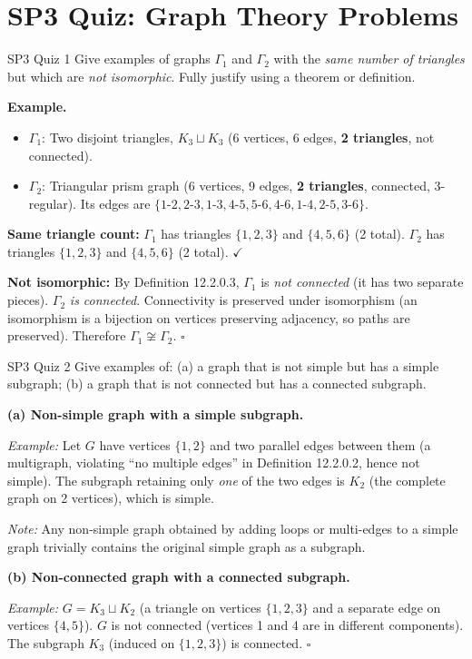 \section*{SP3 Quiz: Graph Theory Problems}

\begin{exercise}{SP3 Quiz 1}
Give examples of graphs $\Gamma_1$ and $\Gamma_2$ with the \emph{same number of triangles} but which are \emph{not isomorphic}. Fully justify using a theorem or definition.
\end{exercise}
\begin{solution}
\textbf{Example.}
\begin{itemize}
  \item $\Gamma_1$: Two disjoint triangles, $K_3\sqcup K_3$ (6 vertices, 6 edges, \textbf{2 triangles}, not connected).
  \item $\Gamma_2$: Triangular prism graph (6 vertices, 9 edges, \textbf{2 triangles}, connected, 3-regular). Its edges are $\{1\text{-}2,2\text{-}3,1\text{-}3,4\text{-}5,5\text{-}6,4\text{-}6,1\text{-}4,2\text{-}5,3\text{-}6\}$.
\end{itemize}

\textbf{Same triangle count:} $\Gamma_1$ has triangles $\{1,2,3\}$ and $\{4,5,6\}$ (2 total). $\Gamma_2$ has triangles $\{1,2,3\}$ and $\{4,5,6\}$ (2 total). $\checkmark$

\textbf{Not isomorphic:} By Definition 12.2.0.3, $\Gamma_1$ is \emph{not connected} (it has two separate pieces). $\Gamma_2$ \emph{is connected}. Connectivity is preserved under isomorphism (an isomorphism is a bijection on vertices preserving adjacency, so paths are preserved). Therefore $\Gamma_1\not\cong\Gamma_2$. $\square$
\end{solution}

\begin{exercise}{SP3 Quiz 2}
Give examples of: (a) a graph that is not simple but has a simple subgraph; (b) a graph that is not connected but has a connected subgraph.
\end{exercise}
\begin{solution}
\textbf{(a) Non-simple graph with a simple subgraph.}

\textit{Example:} Let $G$ have vertices $\{1,2\}$ and two parallel edges between them (a multigraph, violating ``no multiple edges'' in Definition 12.2.0.2, hence not simple). The subgraph retaining only \emph{one} of the two edges is $K_2$ (the complete graph on 2 vertices), which is simple.

\textit{Note:} Any non-simple graph obtained by adding loops or multi-edges to a simple graph trivially contains the original simple graph as a subgraph.

\textbf{(b) Non-connected graph with a connected subgraph.}

\textit{Example:} $G = K_3 \sqcup K_2$ (a triangle on vertices $\{1,2,3\}$ and a separate edge on vertices $\{4,5\}$). $G$ is not connected (vertices 1 and 4 are in different components). The subgraph $K_3$ (induced on $\{1,2,3\}$) is connected. $\square$
\end{solution}


